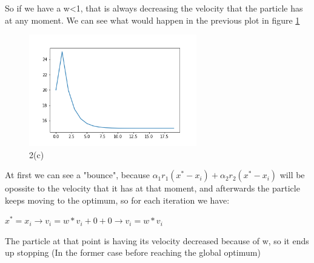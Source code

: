 \documentclass{scrartcl}
\begin{document}
So if we have a w<1, that is always decreasing the velocity that the
particle has at any moment. We can see what would happen in the previous
plot in figure \ref{fig:2c}

\begin{figure}
  \centering
  \includegraphics[width=0.65\textwidth]{images/2c.png}
  \caption{2(c)}
  \label{fig:2c}
\end{figure}

At first we can see a "bounce", because $\alpha _1 r_1 (x^{*} - x_i) + \alpha _2 r_2 (x^{*} - x_i)$ will be opossite to the velocity that it has at that moment, and afterwards the particle keeps moving to the optimum, so for each iteration we have:

$x^{*} = x_i \rightarrow v_i = w*v_i +0 +0 \rightarrow v_i = w*v_i$

The particle at that point is having its velocity decreased because of w, so it ends up stopping (In the former case before reaching the global optimum)
\end{document}
